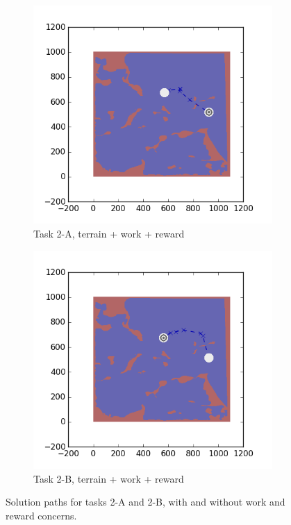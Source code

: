 \documentclass{tamuccthesis}
\begin{document}
\begin{figure}[H]
  \begin{subfigure}[b]{0.4\textwidth}
        \centering
        \includegraphics[width=\textwidth,trim={4cm 3cm 2cm 3cm},clip]{EXP3RG_PathBa_-1_-1_-1_-1.png}
        \caption{{\small Task 2-A, terrain + work + reward}}    
        \label{fig:Path_2-A_terrain_work_reward}
    \end{subfigure}
    \hfill
    \begin{subfigure}[b]{0.4\textwidth}  
        \centering 
        \includegraphics[width=\textwidth,trim={4cm 3cm 2cm 3cm},clip]{EXP3RG_PathBb_-1_-1_-1_-1.png}
        \caption{Task 2-B, terrain + work + reward} 
        \label{fig:Path_2-B_terrain_work_reward}
    \end{subfigure}

    \caption{Solution paths for tasks 2-A and 2-B, with and without work and reward concerns.}
    \label{fig:Paths_2-A_2-B}
\end{figure}
\end{document}
